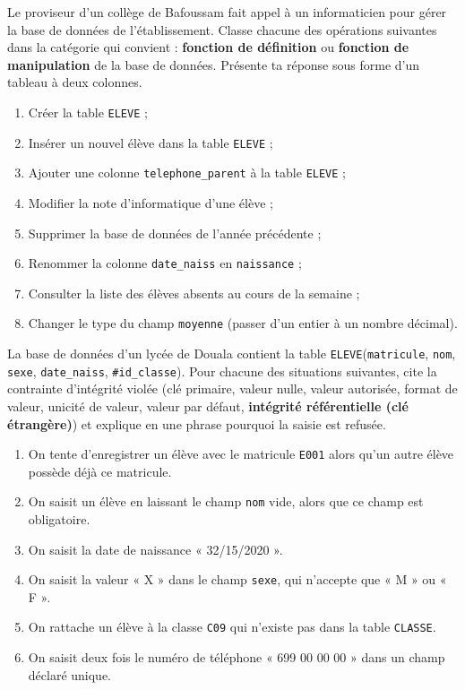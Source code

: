 \documentclass[11pt]{article}
\begin{document}
\begin{exercice}
Le proviseur d'un collège de Bafoussam fait appel à un informaticien pour gérer la base de données de l'établissement. Classe chacune des opérations suivantes dans la catégorie qui convient : \textbf{fonction de définition} ou \textbf{fonction de manipulation} de la base de données. Présente ta réponse sous forme d'un tableau à deux colonnes.
\begin{enumerate}
\item Créer la table \texttt{ELEVE} ;
\item Insérer un nouvel élève dans la table \texttt{ELEVE} ;
\item Ajouter une colonne \texttt{telephone\_parent} à la table \texttt{ELEVE} ;
\item Modifier la note d'informatique d'une élève ;
\item Supprimer la base de données de l'année précédente ;
\item Renommer la colonne \texttt{date\_naiss} en \texttt{naissance} ;
\item Consulter la liste des élèves absents au cours de la semaine ;
\item Changer le type du champ \texttt{moyenne} (passer d'un entier à un nombre décimal).
\end{enumerate}
\end{exercice}

\begin{exercice}
La base de données d'un lycée de Douala contient la table \texttt{ELEVE}(\texttt{matricule}, \texttt{nom}, \texttt{sexe}, \texttt{date\_naiss}, \texttt{\#id\_classe}). Pour chacune des situations suivantes, cite la contrainte d'intégrité violée (clé primaire, valeur nulle, valeur autorisée, format de valeur, unicité de valeur, valeur par défaut, \textbf{intégrité référentielle (clé étrangère)}) et explique en une phrase pourquoi la saisie est refusée.
\begin{enumerate}
\item On tente d'enregistrer un élève avec le matricule \texttt{E001} alors qu'un autre élève possède déjà ce matricule.
\item On saisit un élève en laissant le champ \texttt{nom} vide, alors que ce champ est obligatoire.
\item On saisit la date de naissance « 32/15/2020 ».
\item On saisit la valeur « X » dans le champ \texttt{sexe}, qui n'accepte que « M » ou « F ».
\item On rattache un élève à la classe \texttt{C09} qui n'existe pas dans la table \texttt{CLASSE}.
\item On saisit deux fois le numéro de téléphone « 699 00 00 00 » dans un champ déclaré unique.
\end{enumerate}
\end{exercice}
\end{document}
